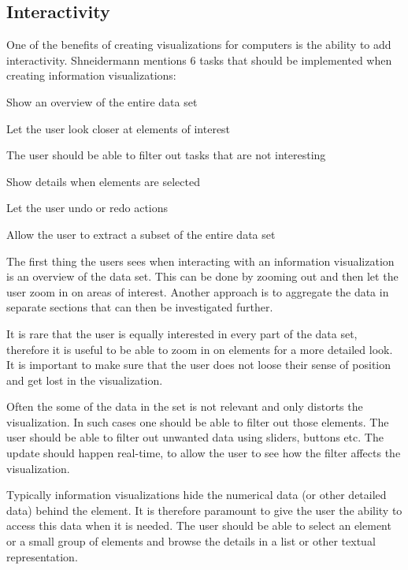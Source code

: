 \subsection{Interactivity}
One of the benefits of creating visualizations for computers is the ability to add interactivity. Shneidermann mentions 6 tasks that should be implemented when creating information visualizations:
\vspace{-3mm}
\begin{description}[itemsep=0cm, parsep=0cm]
  \item[Overview] Show an overview of the entire data set
  \item[Zoom] Let the user look closer at elements of interest
  \item[Filter] The user should be able to filter out tasks that are not interesting
  \item[Details-on-demand] Show details when elements are selected
  \item[History] Let the user undo or redo actions
  \item[Extract] Allow the user to extract a subset of the entire data set
\end{description}

The first thing the users sees when interacting with an information visualization is an overview of the data set. This can be done by zooming out and then let the user zoom in on areas of interest. Another approach is to aggregate the data in separate sections that can then be investigated further.

It is rare that the user is equally interested in every part of the data set, therefore it is useful to be able to zoom in on elements for a more detailed look. It is important to make sure that the user does not loose their sense of position and get lost in the visualization.

Often the some of the data in the set is not relevant and only distorts the visualization. In such cases one should be able to filter out those elements. The user should be able to filter out unwanted data using sliders, buttons etc. The update should happen real-time, to allow the user to see how the filter affects the visualization. 

Typically information visualizations hide the numerical data (or other detailed data) behind the element. It is therefore paramount to give the user the ability to access this data when it is needed. The user should be able to select an element or a small group of elements and browse the details in a list or other textual representation.


